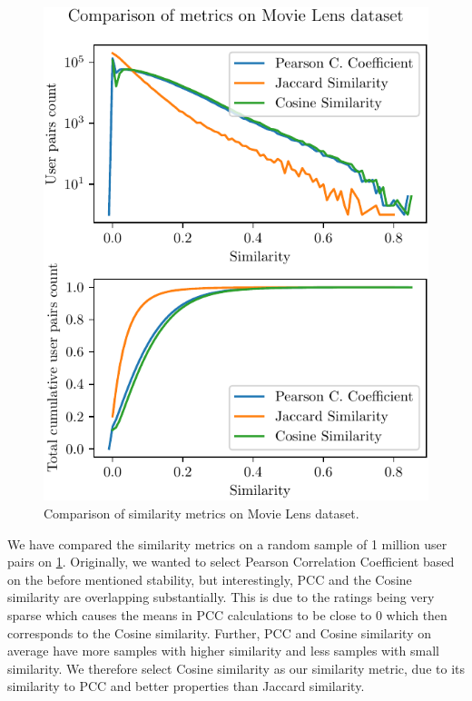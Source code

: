 \begin{figure}[ht!]
    \centering
    \includegraphics{img/figures/similarity_metrics.pdf}
    \caption{Comparison of similarity metrics on Movie Lens dataset.}
    \label{fig:similarity_metrics}
\end{figure}


We have compared the similarity metrics on a random sample of 1 million user pairs on \ref{fig:similarity_metrics}. Originally, we wanted to select Pearson Correlation Coefficient based on the before mentioned stability, but interestingly, PCC and the Cosine similarity are overlapping substantially. This is due to the ratings being very sparse which causes the means in PCC calculations to be close to 0 which then corresponds to the Cosine similarity. Further, PCC and Cosine similarity on average have more samples with higher similarity and less samples with small similarity. We therefore select Cosine similarity as our similarity metric, due to its similarity to PCC and better properties than Jaccard similarity.

